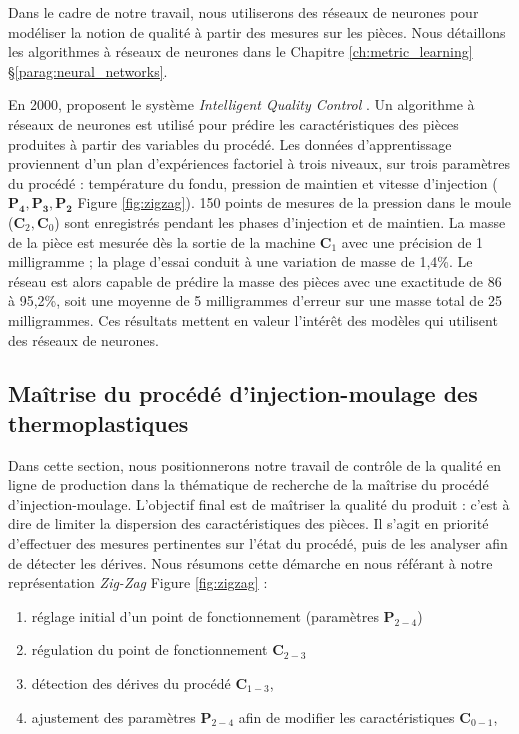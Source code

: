 Dans le cadre de notre travail, nous utiliserons des réseaux de neurones pour modéliser la notion de qualité à partir des mesures sur les pièces.
Nous détaillons les algorithmes à réseaux de neurones dans le Chapitre \ref{ch:metric_learning} §\ref{parag:neural_networks}.

En 2000, \citeauthor{schnerr-haselbarth_automation_2000} proposent le système \textit{Intelligent Quality Control} \cite{schnerr-haselbarth_automation_2000}.
Un algorithme à réseaux de neurones est utilisé pour prédire les caractéristiques des pièces produites à partir des variables du procédé.
Les données d’apprentissage proviennent d’un plan d'expériences factoriel à trois niveaux, sur trois paramètres du procédé : température du fondu, pression de maintien et vitesse d’injection ($\boldsymbol{P_4, P_3, P_2}$ Figure \ref{fig:zigzag}).
150 points de mesures de la pression dans le moule ($\boldsymbol{C}_2, \boldsymbol{C}_0$) sont enregistrés pendant les phases d’injection et de maintien.
La masse de la pièce est mesurée dès la sortie de la machine $\boldsymbol{C}_1$ avec une précision de 1 milligramme ; la plage d’essai conduit à une variation de masse de 1,4\%.
Le réseau est alors capable de prédire la masse des pièces avec une exactitude de 86 à 95,2\%, soit une moyenne de 5 milligrammes d’erreur sur une masse total de 25 milligrammes.
Ces résultats mettent en valeur l'intérêt des modèles qui utilisent des réseaux de neurones.

\subsection{Maîtrise du procédé d'injection-moulage des thermoplastiques} \label{subsec:process_control}
Dans cette section, nous positionnerons notre travail de contrôle de la qualité en ligne de production dans la thématique de recherche de la maîtrise du procédé d'injection-moulage.
L'objectif final est de maîtriser la qualité du produit : c'est à dire de limiter la dispersion des caractéristiques des pièces.
Il s'agit en priorité d'effectuer des mesures pertinentes sur l'état du procédé, puis de les analyser afin de détecter les dérives. Nous résumons cette démarche en nous référant à notre représentation \textit{Zig-Zag} Figure \ref{fig:zigzag} :
\begin{enumerate}
	\item réglage initial d'un point de fonctionnement (paramètres $\boldsymbol{P}_{2-4}$)  %
	\item régulation du point de fonctionnement $\boldsymbol{C}_{2-3}$  %
	\item détection des dérives du procédé $\boldsymbol{C}_{1-3}$,
	\item ajustement des paramètres $\boldsymbol{P}_{2-4}$ afin de modifier les caractéristiques $\boldsymbol{C}_{0-1}$,
\end{enumerate}

